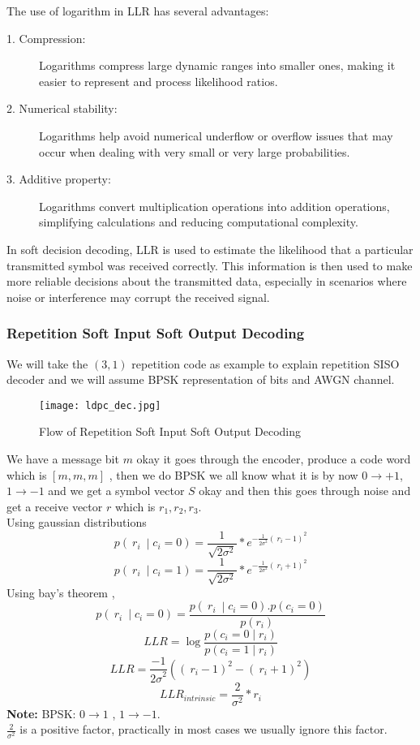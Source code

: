 The use of logarithm in LLR has several advantages:
\begin{description}
    \item[1. Compression:] Logarithms compress large dynamic ranges into smaller ones, making it easier to represent and process likelihood ratios.
    \item[2. Numerical stability:] Logarithms help avoid numerical underflow or overflow issues that may occur when dealing with very small or very large probabilities.
    \item[3. Additive property:] Logarithms convert multiplication operations into addition operations, simplifying calculations and reducing computational complexity. 
\end{description}
In soft decision decoding, LLR is used to estimate the likelihood that a particular transmitted symbol was received correctly. This information is then used to make more reliable decisions about the transmitted data, especially in scenarios where noise or interference may corrupt the received signal.

\subsubsection{Repetition Soft Input Soft Output Decoding}
We will take the $(3, 1)$ repetition code as example to explain repetition SISO decoder and we will assume BPSK representation of bits and AWGN channel.
\begin{figure}[h]
    \centering
    \texttt{[image: ldpc\_dec.jpg]}
    \caption{Flow of Repetition Soft Input Soft Output Decoding}
    \label{fig:flow of LDPC RSISOD}
\end{figure}
We have a message bit $m$ okay it goes through the encoder, produce a code word which is $[m , m , m]$ , then we do BPSK we all know what it is by now $0 \rightarrow +1$, $1 \rightarrow -1$ and we get a symbol vector $S$ okay and then this goes through noise and get a receive vector $r$ which is $r_1, r_2, r_3$.\\
Using gaussian distributions
\[ p\left({\ r}_i\ \middle| c_i=0\right)=\frac{1}{\sqrt{2\sigma^2}}\ast e^{{-\frac{1}{{2\sigma}^2}({\ r}_i-1)}^2} \]
\[ p\left({\ r}_i\ \middle| c_i=1\right)=\frac{1}{\sqrt{2\sigma^2}}\ast e^{{-\frac{1}{{2\sigma}^2}({\ r}_i+1)}^2} \]
Using bay's theorem ,
\[p\left({\ r}_i\ \middle| c_i=0\right)=\frac{p\left({\ r}_i\ \middle| c_i=0\right).p(c_i=0)}{p(r_i)}\]
\[LLR=\log\frac{p\left(c_i=0\middle| r_i\right)}{p\left(c_i=1\middle| r_i\right)}\]
\[LLR=\frac{-1}{{2\sigma}^2}\left(\left(\ r_i-1\right)^2-\left(\ r_i+1\right)^2\right)\]
\[{LLR}_{intrinsic}= \frac{2}{\sigma^2} \ast r_i\]
\textbf{Note:} BPSK: $0 \rightarrow 1$ , $1 \rightarrow -1$.\\
$\frac{2}{\sigma^2}$ is a positive factor, practically in most cases we usually ignore this factor.\\

